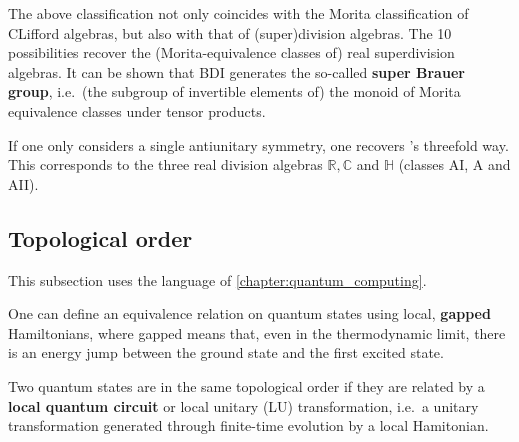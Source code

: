     \begin{remark}
        The above classification not only coincides with the Morita classification of CLifford algebras, but also with that of (super)division algebras. The 10 possibilities recover the (Morita-equivalence classes of) real superdivision algebras. It can be shown that BDI generates the so-called \textbf{super Brauer group}, i.e.~(the subgroup of invertible elements of) the monoid of Morita equivalence classes under tensor products.
    \end{remark}

    \begin{property}
        If one only considers a single antiunitary symmetry, one recovers 's threefold way. This corresponds to the three real division algebras $\mathbb{R},\mathbb{C}$ and $\mathbb{H}$ (classes AI, A and AII).
    \end{property}

\subsection{Topological order}

    This subsection uses the language of \cref{chapter:quantum_computing}.

    One can define an equivalence relation on quantum states using local, \textbf{gapped} Hamiltonians, where gapped means that, even in the thermodynamic limit, there is an energy jump between the ground state and the first excited state.
    \begin{adefinition}
        Two quantum states are in the same topological order if they are related by a \textbf{local quantum circuit} or local unitary (LU) transformation, i.e.~a unitary transformation generated through finite-time evolution by a local Hamitonian.
    \end{adefinition}

